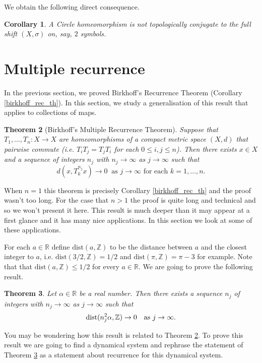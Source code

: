 \documentclass[12pt]{article}
\newtheorem{theorem}{Theorem}[section]
\newtheorem{corollary}[theorem]{Corollary}
\theoremstyle{definition}
\theoremstyle{remark}
\begin{document}
We obtain the following direct consequence.
\begin{corollary}
    A Circle homeomorphism is not topologically conjugate to the full shift $(X,\sigma)$ on, say, $2$ symbols.
\end{corollary}
\section{Multiple recurrence}

In the previous section, we proved Birkhoff's Recurrence Theorem (Corollary \ref{birkhoff_rec_th}). In this section, we study a generalisation of this result that applies to collections of maps. 

\begin{theorem}[Birkhoff's Multiple Recurrence Theorem]\label{thm.bmr}
Suppose that $T_1, \ldots, T_n : X \to X$ are homeomorphisms of a compact metric space $(X,d)$ that pairwise commute (i.e. $T_iT_j = T_jT_i$ for each $0\le i,j \le n$). Then there exists $x\in X$ and a sequence of integers $n_j$ with $n_j \to \infty$ as $j\to\infty$ such that
\[
d(x,T_k^{n_j}x) \to 0 \ \text{ as $j \to \infty$ for each $k=1, \ldots, n$}.
\]
\end{theorem}
When $n =1$ this theorem is precisely Corollary \ref{birkhoff_rec_th} and the proof wasn't too long.  For the case that $n > 1$ the proof is quite long and technical and so we won't present it here.  This result is much deeper than it may appear at a first glance and it has many nice applications. In this section we look at some of these applications.

 For each $a \in \mathbb R$ define $\text{dist}(a, \mathbb{Z})$ to be the distance between $a$ and the closest integer to $a$, i.e. $\text{dist}(3/2, \mathbb{Z}) = 1/2$ and $\text{dist}(\pi,\mathbb{Z}) = \pi - 3$ for example.  Note that that $\text{dist}(a, \mathbb{Z}) \le 1/2$ for every $a\in\mathbb R$. We are going to prove the following result.

\begin{theorem}\label{thm.mrex}
Let $\alpha \in \mathbb{R}$ be a real number. Then there exists a sequence $n_j$ of integers with  $n_j \to \infty$ as $j\to\infty$ such that
\[
\textnormal{dist}(n_j^2\alpha, \mathbb{Z}) \to 0 \ \ \text{ as $j\to\infty$.}
\]
\end{theorem}
You may be wondering how this result is related to Theorem \ref{thm.bmr}. To prove this result we are going to find a dynamical system and rephrase the statement of Theorem \ref{thm.mrex} as a statement about recurrence for this dynamical system. 
\end{document}
